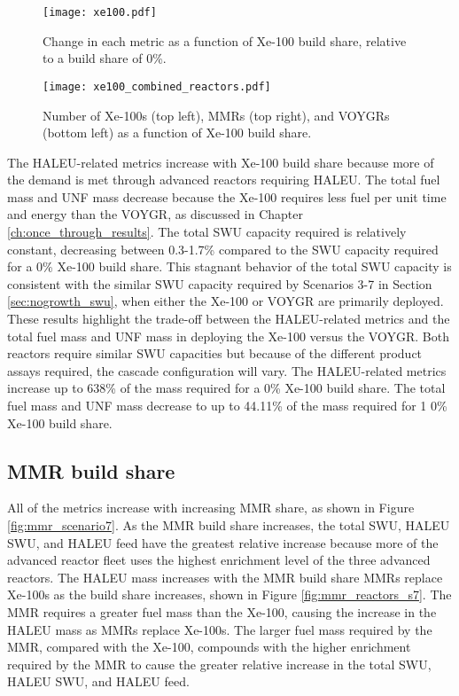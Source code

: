 \begin{figure}[h!]
    \centering
    \texttt{[image: xe100.pdf]}
    \caption{Change in each metric as a function of Xe-100 build share, 
    relative to a build share of 0\%.}
    \label{fig:xe100_scenario7}
\end{figure}

\begin{figure}[h!]
    \centering
    \texttt{[image: xe100\_combined\_reactors.pdf]}
    \caption{Number of Xe-100s (top left), MMRs (top right), and VOYGRs
    (bottom left) as a function of Xe-100 build share.}
    \label{fig:xe100_s7_combined_reactors}
\end{figure}

The \gls{HALEU}-related metrics increase with Xe-100 build share because more of 
the demand is met through advanced reactors requiring \gls{HALEU}. The total 
fuel mass and \gls{UNF} mass decrease because the 
Xe-100 requires less fuel per unit time and energy than the VOYGR, as discussed 
in Chapter \ref{ch:once_through_results}. The total \gls{SWU} capacity required 
is relatively constant, decreasing between 0.3-1.7\% compared to the \gls{SWU} capacity 
required for a 0\% Xe-100 build share. This stagnant behavior of the total 
\gls{SWU} capacity is consistent with the similar \gls{SWU} capacity required 
by Scenarios 3-7 in Section \ref{sec:nogrowth_swu}, when either the Xe-100 or 
VOYGR are primarily deployed. These results highlight the trade-off between the
\gls{HALEU}-related metrics and the total fuel mass and \gls{UNF} mass in deploying 
the Xe-100 versus the VOYGR. Both reactors require similar \gls{SWU} capacities 
but because of the different product assays required, the cascade configuration 
will vary. The \gls{HALEU}-related metrics increase up to 638\% of the 
mass required 
for a 0\% Xe-100 build share. The total fuel mass and \gls{UNF} mass decrease 
to up to 44.11\% of the mass required for 1 0\% Xe-100 build share. 

\subsection{MMR build share}
All of the metrics increase with increasing \gls{MMR} share, as shown 
in Figure \ref{fig:mmr_scenario7}. As the \gls{MMR} build share 
increases, the total \gls{SWU}, \gls{HALEU} \gls{SWU}, 
and \gls{HALEU} feed have the greatest relative increase because more of the 
advanced reactor fleet uses the highest enrichment level of the three 
advanced reactors. The \gls{HALEU} mass 
increases with the \gls{MMR} build share \glspl{MMR} replace Xe-100s
as the build share increases, shown in  
Figure \ref{fig:mmr_reactors_s7}.
The \gls{MMR} requires a greater fuel mass than the Xe-100, causing the increase 
in the \gls{HALEU} mass as \glspl{MMR} replace Xe-100s. 
The larger fuel mass required by the \gls{MMR}, compared 
with the Xe-100, compounds with the higher enrichment required by the \gls{MMR} 
to cause the greater relative increase in the total \gls{SWU}, \gls{HALEU} \gls{SWU}, 
and \gls{HALEU} feed. 

